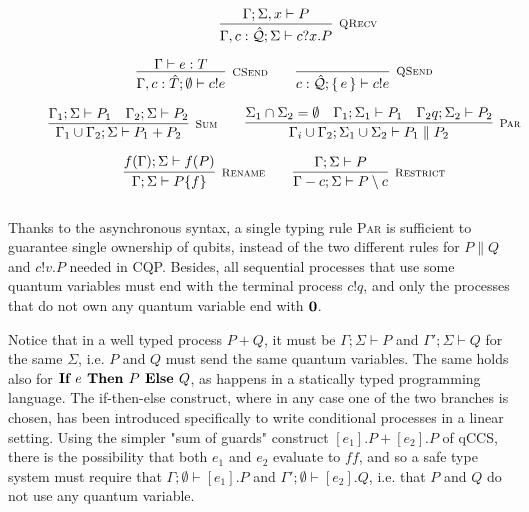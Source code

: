 \begin{figure}[h!]
\begin{gather*}
\qquad
\infer[\mbox{\footnotesize\scshape QRecv}]
{\Gamma, c : \hat{\mathcal{Q}}; \Sigma \vdash c?x . P}
{ \Gamma; \Sigma, x \vdash P} 
\\[0.2cm]
\infer[\mbox{\footnotesize\scshape CSend}]{\Gamma, c : \hat{T}; \emptyset \vdash c!e}{ \Gamma \vdash e : T} \qquad
\infer[\mbox{\footnotesize\scshape QSend}]{c : \hat{\mathcal{Q}} ; \set{e} \vdash c!e}{} \\[0.2cm]
\infer[\mbox{\footnotesize\scshape Sum}]{\Gamma_1 \cup \Gamma_2; \Sigma \vdash P_1 + P_2}{\Gamma_1; \Sigma \vdash P_1 & \Gamma_2; \Sigma \vdash P_2} \qquad 
\infer[\mbox{\footnotesize\scshape Par}]{\Gamma_i \cup \Gamma_2; \Sigma_1 \cup \Sigma_2 \vdash P_1 \parallel P_2}
{\Sigma_1 \cap \Sigma_2 = \emptyset & \Gamma_1; \Sigma_1 \vdash P_1 & \Gamma_2 q; \Sigma_2 \vdash P_2} \\[0.2cm]
\infer[\mbox{\footnotesize\scshape Rename}]{\Gamma; \Sigma \vdash P \{f\}}{f(\Gamma); \Sigma \vdash f(P)} \qquad
\infer[\mbox{\footnotesize\scshape Restrict}]{\Gamma - c; \Sigma \vdash P \setminus c}{\Gamma; \Sigma \vdash P} \\[0.3cm]
\end{gather*}
\end{figure}

Thanks to the asynchronous syntax, a single typing rule {\scshape Par} is sufficient to guarantee single ownership of qubits, instead of the two different rules for $P \parallel Q$ and $c!v.P$ needed in CQP. Besides, all sequential processes that use some quantum variables must end with the terminal process $c!q$, and only the processes that do not own any quantum variable end with $\mathbf{0}$. 

Notice that in a well typed process $P + Q$, it must be $\Gamma; \Sigma \vdash P$ and $\Gamma'; \Sigma \vdash Q$ for the same $\Sigma$, i.e. $P$ and $Q$ must send the same quantum variables. The same holds also for $\textbf{If }{e}\textbf{ Then } {P} \textbf{ Else } {Q}$, as happens in a statically typed programming language. The if-then-else construct, where in any case one of the two branches is chosen, has been introduced specifically to write conditional processes in a linear setting. Using the simpler "sum of guards" construct $[e_1].P + [e_2].P$ of qCCS, there is the possibility that both $e_1$ and $e_2$ evaluate to $ff$, and so a safe type system must require that $\Gamma; \emptyset \vdash [e_1].P$ and $\Gamma'; \emptyset \vdash [e_2].Q$, i.e. that $P$ and $Q$ do not use any quantum variable. 

